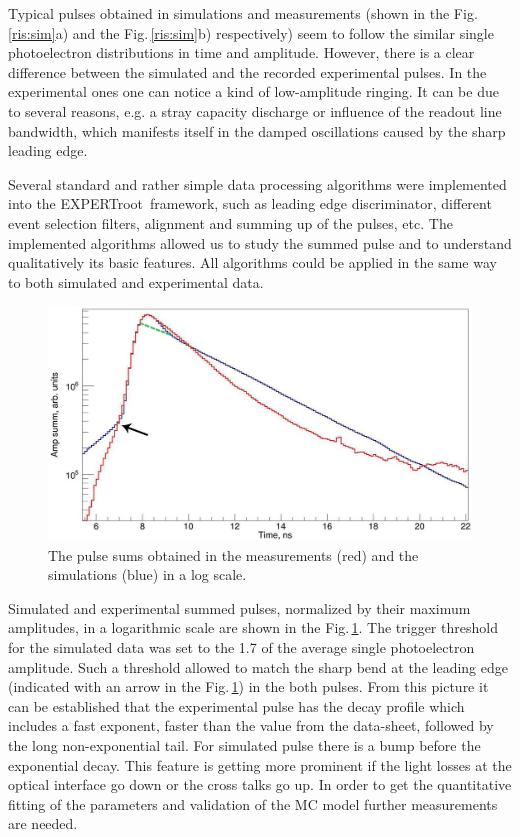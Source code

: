\documentclass{webofc}
\newcommand{\er}{\textmd{EXPERTroot}}
\newcommand{\red}[1]{\textcolor{red}{#1}}
\begin{document}
Typical pulses obtained in simulations and measurements (shown in the Fig.\,\ref{ris:sim}a) and the Fig.\,\ref{ris:sim}b) respectively) seem to follow the similar single photoelectron distributions in time and amplitude.
However, there is a clear difference between the simulated and the recorded experimental pulses. In the experimental ones one can notice a kind of low-amplitude ringing. It can be due to several reasons, e.g. a stray capacity discharge or influence of the readout line bandwidth, which manifests itself in the damped oscillations caused by the sharp leading edge.

Several standard and rather simple data processing algorithms were implemented into the \er\ framework, such as leading edge discriminator, different event selection filters, alignment and summing up of the pulses, etc. The implemented algorithms allowed us to study the summed pulse and to understand qualitatively its basic features. All algorithms could be applied in the same way to both simulated and experimental data.

\begin{figure}[h]
	\centering
	\includegraphics[width=0.63\linewidth]{summ.png}
	\caption{The pulse sums obtained in the measurements (red) and the simulations (blue) in a log scale.}\label{ris:sum}
\end{figure}



Simulated and experimental summed pulses, normalized by their maximum amplitudes, in a logarithmic scale are shown in the Fig.\,\ref{ris:sum}.
The trigger threshold for the simulated data was set to the 1.7 of the average single photoelectron amplitude.
Such a threshold allowed to match the sharp bend at the leading edge (indicated with an arrow in the Fig.\,\ref{ris:sum}) in the both pulses. From this picture it can be established that the experimental pulse has the decay profile which includes a fast exponent, faster than the value from the data-sheet, followed by the long non-exponential tail. For simulated pulse there is a bump before the exponential decay. This feature is getting more prominent if the light losses at the optical interface go down or the cross talks go up. In order to get the quantitative fitting of the parameters and validation of the MC model further measurements are needed. 
\end{document}
